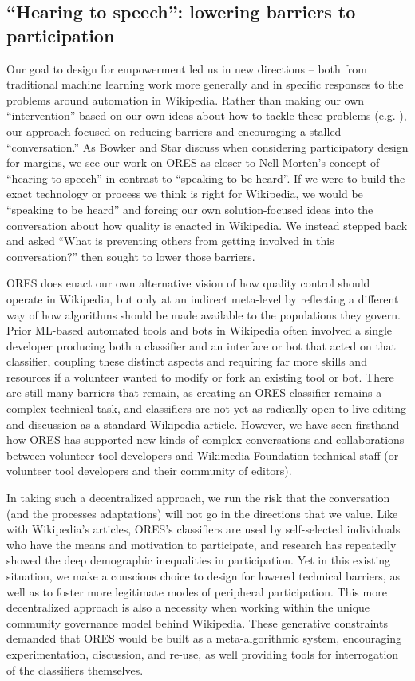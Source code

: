\subsection{``Hearing to speech'': lowering barriers to participation}
Our goal to design for empowerment led us in new directions -- both from traditional machine learning work more generally and in specific responses to the problems around automation in Wikipedia. Rather than making our own ``intervention'' based on our own ideas about how to tackle these problems (e.g. \cite{halfaker2014snuggle}), our approach focused on reducing barriers and encouraging a stalled ``conversation.'' As Bowker and Star discuss when considering participatory design for margins\cite{bowker1999sorting}, we see our work on ORES as closer to Nell Morten's concept of ``hearing to speech'' in contrast to ``speaking to be heard\cite{morton1985journey}''. If we were to build the exact technology or process we think is right for Wikipedia, we would be ``speaking to be heard'' and forcing our own solution-focused ideas into the conversation about how quality is enacted in Wikipedia. We instead stepped back and asked ``What is preventing others from getting involved in this conversation?'' then sought to lower those barriers.

ORES does enact our own alternative vision of how quality control should operate in Wikipedia, but only at an indirect meta-level by reflecting a different way of how algorithms should be made available to the populations they govern. Prior ML-based automated tools and bots in Wikipedia often involved a single developer producing both a classifier and an interface or bot that acted on that classifier, coupling these distinct aspects and requiring far more skills and resources if a volunteer wanted to modify or fork an existing tool or bot. There are still many barriers that remain, as creating an ORES classifier remains a complex technical task, and classifiers are not yet as radically open to live editing and discussion as a standard Wikipedia article. However, we have seen firsthand how ORES has supported new kinds of complex conversations and collaborations between volunteer tool developers and Wikimedia Foundation technical staff (or volunteer tool developers and their community of editors).

In taking such a decentralized approach, we run the risk that the conversation (and the processes adaptations) will not go in the directions that we value. Like with Wikipedia's articles, ORES's classifiers are used by self-selected individuals who have the means and motivation to participate, and research has repeatedly showed the deep demographic inequalities in participation\cite{lam2011wp,graham2014uneven}. Yet in this existing situation, we make a conscious choice to design for lowered technical barriers, as well as to foster more legitimate modes of peripheral participation. This more decentralized approach is also a necessity when working within the unique community governance model behind Wikipedia.  These generative constraints demanded that ORES would be built as a meta-algorithmic system, encouraging experimentation, discussion, and re-use, as well providing tools for interrogation of the classifiers themselves.


